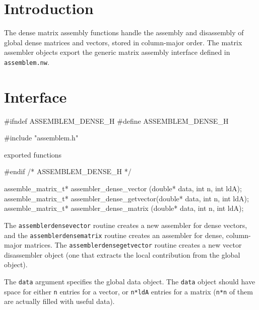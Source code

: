 
\section{Introduction}

The dense matrix assembly functions handle the assembly and
disassembly of global dense matrices and vectors, stored
in column-major order.  The matrix assembler objects export
the generic matrix assembly interface defined in {\tt{}assemblem.nw}.


\section{Interface}

\endmoddef
#ifndef ASSEMBLEM_DENSE_H
#define ASSEMBLEM_DENSE_H

#include "assemblem.h"

\LA{}exported functions~{\nwtagstyle{}}\RA{}

#endif /* ASSEMBLEM_DENSE_H */
\nwendcode{}\nwdocspar

\nwenddocs{}\endmoddef
assemble_matrix_t* assembler_dense_vector   (double* data, int n, int ldA);
assemble_matrix_t* assembler_dense_getvector(double* data, int n, int ldA);
assemble_matrix_t* assembler_dense_matrix   (double* data, int n, int ldA);
\nwendcode{}\nwdocspar

The {\tt{}assembler{}dense{}vector} routine creates a new assembler for
dense vectors, and the {\tt{}assembler{}dense{}matrix} routine creates
an assembler for dense, column-major matrices.
The {\tt{}assembler{}dense{}getvector} routine creates a new vector disassembler
object (one that extracts the local contribution from the global object).

The {\tt{}data} argument specifies the global data object.  The {\tt{}data}
object should have space for either {\tt{}n} entries for a vector,
or {\tt{}n*ldA} entries for a matrix ({\tt{}n*n} of them are actually filled
with useful data).

